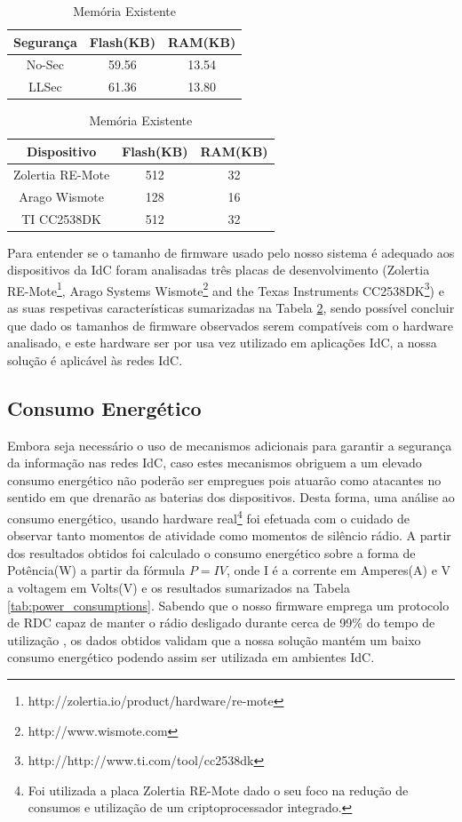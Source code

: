 \documentclass{llncs}
\begin{document}
\begin{table}
\parbox{.45\linewidth}{
\centering
\caption{Memória Utilizada}
\label{tab:space_req}
\begin{tabular}{|c|c|c|} \hline
Segurança&Flash(KB)&RAM(KB)\\ \hline
No-Sec& 59.56& 13.54\\ \hline
LLSec& 61.36& 13.80\\ 
\hline\end{tabular}
}
\hfill
\parbox{.50\linewidth}{
\centering
\caption{Memória Existente}
\label{tab:existing_space}
\begin{tabular}{|c|c|c|} \hline
Dispositivo&Flash(KB)&RAM(KB)\\ \hline
Zolertia RE-Mote& 512& 32\\ \hline
Arago Wismote& 128& 16\\ \hline
TI CC2538DK& 512 & 32\\
\hline\end{tabular}
}
\end{table}

Para entender se o tamanho de firmware usado pelo nosso sistema é adequado aos dispositivos da \ac{IdC} foram analisadas três placas de desenvolvimento (Zolertia RE-Mote\footnote{http://zolertia.io/product/hardware/re-mote}, Arago Systems Wismote\footnote{http://www.wismote.com} and the Texas Instruments CC2538DK\footnote{http://http://www.ti.com/tool/cc2538dk}) e as suas respetivas características sumarizadas na Tabela \ref{tab:existing_space}, sendo possível concluir que dado os tamanhos de firmware observados serem compatíveis com o hardware analisado, e este hardware ser por usa vez utilizado em aplicações \ac{IdC}, a nossa solução é aplicável às redes \ac{IdC}.

\subsection{Consumo Energético}
Embora seja necessário o uso de mecanismos adicionais para garantir a segurança da informação nas redes \ac{IdC}, caso estes mecanismos obriguem a um elevado consumo energético não poderão ser empregues pois atuarão como atacantes no sentido em que drenarão as baterias dos dispositivos. Desta forma, uma análise ao consumo energético, usando hardware real\footnote{Foi utilizada a placa Zolertia RE-Mote dado o seu foco na redução de consumos e utilização de um criptoprocessador integrado.} foi efetuada com o cuidado de observar tanto momentos de atividade como momentos de silêncio rádio. A partir dos resultados obtidos foi calculado o consumo energético sobre a forma de Potência(W) a partir da fórmula $P = I  V$, onde I é a corrente em Amperes(A) e V a voltagem em Volts(V) e os resultados sumarizados na Tabela \ref{tab:power_consumptions}. Sabendo que o nosso firmware emprega um protocolo de \ac{RDC} capaz de manter o rádio desligado durante cerca de 99\% do tempo de utilização \cite{Dunkels2011}, os dados obtidos validam que a nossa solução mantém um baixo consumo energético podendo assim ser utilizada em ambientes \ac{IdC}.
\end{document}
